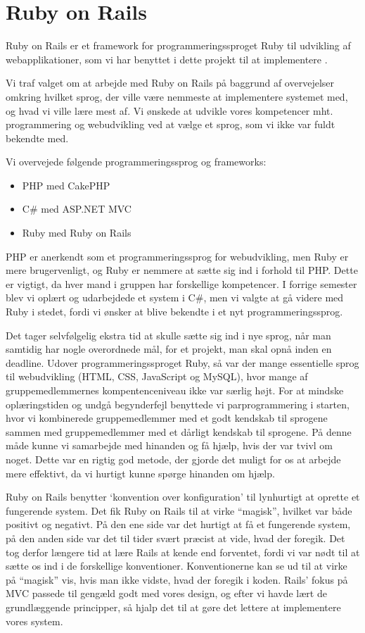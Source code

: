\chapter{Ruby on Rails}
\label{akademiskror}

Ruby on Rails er et framework for programmeringssproget Ruby til udvikling af webapplikationer, som vi har benyttet i dette projekt til at implementere {\Foodl}.

Vi traf valget om at arbejde med Ruby on Rails på baggrund af overvejelser omkring hvilket sprog, der ville være nemmeste at implementere systemet med, og hvad vi ville lære mest af. Vi ønskede at udvikle vores kompetencer mht. programmering og webudvikling ved at vælge et sprog, som vi ikke var fuldt bekendte med. 

Vi overvejede følgende programmeringssprog og frameworks:

\begin{itemize}[noitemsep]
\item PHP med CakePHP
\item C\# med ASP.NET MVC
\item Ruby med Ruby on Rails
\end{itemize}

PHP er anerkendt som et programmeringssprog for webudvikling, men Ruby er mere brugervenligt, og Ruby er nemmere at sætte sig ind i forhold til PHP. Dette er vigtigt, da hver mand i gruppen har forskellige kompetencer. I forrige semester blev vi oplært og udarbejdede et system i C\#, men vi valgte at gå videre med Ruby i stedet, fordi vi ønsker at blive bekendte i et nyt programmeringssprog.

Det tager selvfølgelig ekstra tid at skulle sætte sig ind i nye sprog, når man samtidig har nogle overordnede mål, for et projekt, man skal opnå inden en deadline. Udover programmeringssproget Ruby, så var der mange essentielle sprog til webudvikling (HTML, CSS, JavaScript og MySQL), hvor mange af gruppemedlemmernes kompentenceniveau ikke var særlig højt. For at mindske oplæringstiden og undgå begynderfejl benyttede vi parprogrammering i starten, hvor vi kombinerede gruppemedlemmer med et godt kendskab til sprogene sammen med gruppemedlemmer med et dårligt kendskab til sprogene. På denne måde kunne vi samarbejde med hinanden og få hjælp, hvis der var tvivl om noget. Dette var en rigtig god metode, der gjorde det muligt for os at arbejde mere effektivt, da vi hurtigt kunne spørge hinanden om hjælp.

Ruby on Rails benytter `konvention over konfiguration' til lynhurtigt at oprette et fungerende system. Det fik Ruby on Rails til at virke ``magisk'', hvilket var både positivt og negativt. På den ene side var det hurtigt at få et fungerende system, på den anden side var det til tider svært præcist at vide, hvad der foregik. Det tog derfor længere tid at lære Rails at kende end forventet, fordi vi var nødt til at sætte os ind i de forskellige konventioner. Konventionerne kan se ud til at virke på ``magisk'' vis, hvis man ikke vidste, hvad der foregik i koden.
Rails' fokus på MVC passede til gengæld godt med vores design, og efter vi havde lært de grundlæggende principper, så hjalp det til at gøre det lettere at implementere vores system.

